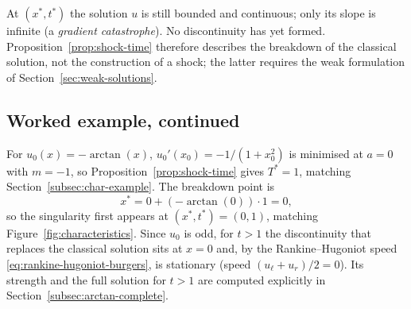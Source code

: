 \begin{remark}
\label{rem:singularity-vs-shock}
At $(x^*,t^*)$ the solution $u$ is still bounded and continuous; only its
slope is infinite (a \emph{gradient catastrophe}). No discontinuity has yet
formed. Proposition~\ref{prop:shock-time} therefore describes the
breakdown of the classical solution, not the construction of a shock; the
latter requires the weak formulation of Section~\ref{sec:weak-solutions}.
\end{remark}

\subsection{Worked example, continued}
\label{subsec:shock-example}

For $u_0(x) = -\arctan(x)$, $u_0'(x_0) = -1/(1+x_0^2)$ is minimised at
$a=0$ with $m=-1$, so Proposition~\ref{prop:shock-time} gives $T^*=1$,
matching Section~\ref{subsec:char-example}. The breakdown point is
\begin{equation}
  x^* = 0 + (-\arctan(0))\cdot 1 = 0,
\end{equation}
so the singularity first appears at $(x^*,t^*) = (0,1)$, matching
Figure~\ref{fig:characteristics}. Since $u_0$ is odd, for $t>1$ the discontinuity that replaces the classical
solution sits at $x=0$ and, by the Rankine--Hugoniot speed
\eqref{eq:rankine-hugoniot-burgers}, is stationary (speed
$(u_\ell+u_r)/2=0$). Its strength and the full solution for $t>1$ are
computed explicitly in Section~\ref{subsec:arctan-complete}.
